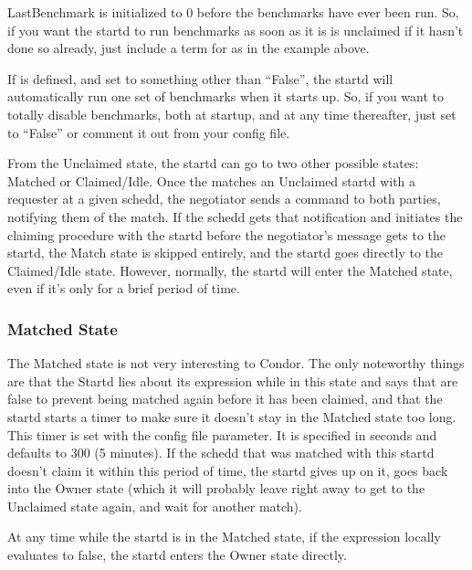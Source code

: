 \Note LastBenchmark is initialized to 0 before the benchmarks
have ever been run.  So, if you want the startd to run benchmarks as
soon as it is is unclaimed if it hasn't done so already, just include
a term for  as in the example above.

\Note If  is defined, and set to something
other than ``False'', the startd will automatically run one set of
benchmarks when it starts up.  So, if you want to totally disable
benchmarks, both at startup, and at any time thereafter, just set 
 to ``False'' or comment it out from your config
file.  

From the Unclaimed state, the startd can go to two other possible
states: Matched or Claimed/Idle.  Once the  matches
an Unclaimed startd with a requester at a given schedd, the negotiator
sends a command to both parties, notifying them of the match.  If the
schedd gets that notification and initiates the claiming procedure
with the startd before the negotiator's message gets to the startd,
the Match state is skipped entirely, and the startd goes directly to
the Claimed/Idle state.  However, normally, the startd will enter the
Matched state, even if it's only for a brief period of time.


\subsubsection{Matched State}
\label{sec:Matched-State}

The Matched state is not very interesting to Condor.  The only
noteworthy things are that the Startd lies about its 
expression while in this state and says that  are
false to prevent being matched again before it has been claimed, and
that the startd starts a timer to make sure it doesn't stay in the
Matched state too long.  This timer is set with the
 \label{param:MatchTimeout} config file
parameter.  It is specified in seconds and defaults to 300 (5
minutes).  If the schedd that was matched with this startd doesn't
claim it within this period of time, the startd gives up on it, goes
back into the Owner state (which it will probably leave right away to
get to the Unclaimed state again, and wait for another match).

At any time while the startd is in the Matched state, if the
 expression locally evaluates to false, the startd enters
the Owner state directly.

